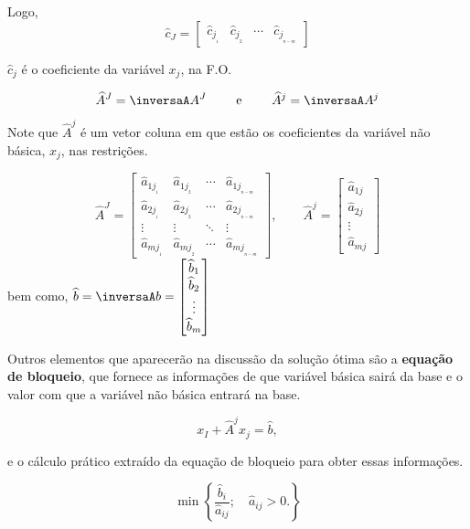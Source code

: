 Logo, 
\[
  \widehat{c}_J = 
  \begin{bmatrix} 
    \widehat{c}_{j_{_1}} & \widehat{c}_{j_{_2}} & \cdots & \widehat{c}_{j_{_{n - m}}}
  \end{bmatrix}
\]

$ \widehat{c}_j $ é o coeficiente da variável $ x_j $, na F.O.

\[
  \widehat{A}^J = \inversaA A^J
  \qquad
  \text{ e }  
  \qquad
  \widehat{A}^j = \inversaA A^{j} 
\]

Note que $ \widehat{A}^j $ é um vetor coluna em que estão os coeficientes da
variável não básica, $ x_j $, nas restrições.

\[
  \widehat{A}^J =
  \begin{bmatrix}
    \widehat{a}_{1j_{_1}} & \widehat{a}_{1j_{_2}} & \cdots & \widehat{a}_{1j_{_{n - m}}} \\
    \widehat{a}_{2j_{_1}} & \widehat{a}_{2j_{_2}} & \cdots & \widehat{a}_{2j_{_{n - m}}} \\ 
    \vdots                & \vdots                & \ddots & \vdots \\
    \widehat{a}_{mj_{_1}} & \widehat{a}_{mj_{_2}} & \cdots & \widehat{a}_{mj_{_{n - m}}}
  \end{bmatrix}
  ,
  \qquad
  \widehat{A}^j =
  \begin{bmatrix}
    \widehat{a}_{1j} \\
    \widehat{a}_{2j} \\
    \vdots \\
    \widehat{a}_{mj} 
  \end{bmatrix}
\]
bem como,
$
  \widehat{b} = \inversaA b = 
    \begin{bmatrix}
      \widehat{b}_1 \\
      \widehat{b}_2 \\
      \vdots \\
      \widehat{b}_m \\
    \end{bmatrix}
$

Outros elementos que aparecerão na discussão da solução ótima são a 
\textbf{equação de bloqueio}, que fornece as informações de que variável básica
sairá da base e o valor com que a variável não básica entrará na base.

\[
  x_I + \widehat{A}^j x_j = \widehat{b},
\]

e o cálculo prático extraído da equação de bloqueio para obter essas informações.

\[ 
  \min 
  \left\{ 
    \frac{\widehat{b}_i}{\widehat{a}_{ij}};\quad \widehat{a}_{ij} > 0.
  \right\}
\]

